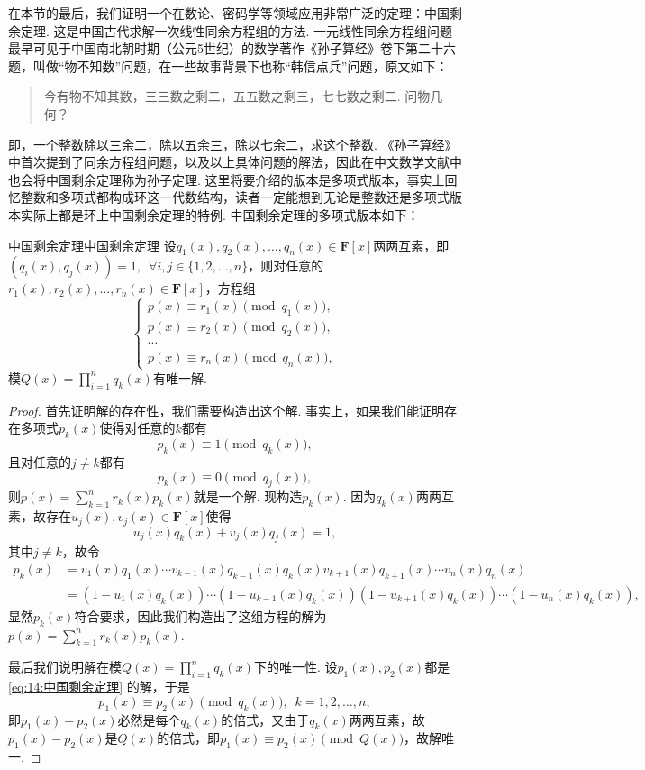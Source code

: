 在本节的最后，我们证明一个在数论、密码学等领域应用非常广泛的定理：中国剩余定理. 这是中国古代求解一次线性同余方程组的方法. 一元线性同余方程组问题最早可见于中国南北朝时期（公元5世纪）的数学著作《孙子算经》卷下第二十六题，叫做``物不知数''问题，在一些故事背景下也称``韩信点兵''问题，原文如下：
\begin{quote}
    \kaishu
    今有物不知其数，三三数之剩二，五五数之剩三，七七数之剩二. 问物几何？
\end{quote}
即，一个整数除以三余二，除以五余三，除以七余二，求这个整数. 《孙子算经》中首次提到了同余方程组问题，以及以上具体问题的解法，因此在中文数学文献中也会将中国剩余定理称为孙子定理. 这里将要介绍的版本是多项式版本，事实上回忆整数和多项式都构成环这一代数结构，读者一定能想到无论是整数还是多项式版本实际上都是环上中国剩余定理的特例. 中国剩余定理的多项式版本如下：
\begin{theorem}{中国剩余定理}{中国剩余定理}
    设$q_1(x),q_2(x),\ldots,q_n(x)\in\mathbf{F}[x]$两两互素，即$(q_i(x),q_j(x))=1,\enspace\forall i,j\in\{1,2,\ldots,n\}$，则对任意的$r_1(x),r_2(x),\ldots,r_n(x)\in\mathbf{F}[x]$，方程组
    \begin{equation} \label{eq:14:中国剩余定理}
        \begin{cases}
            p(x)\equiv r_1(x)\pmod{q_1(x)}, \\
            p(x)\equiv r_2(x)\pmod{q_2(x)}, \\
            \cdots                          \\
            p(x)\equiv r_n(x)\pmod{q_n(x)},
        \end{cases}
    \end{equation}
    模$Q(x)=\prod\limits_{i=1}^nq_k(x)$有唯一解.
\end{theorem}
\begin{proof}
    首先证明解的存在性，我们需要构造出这个解. 事实上，如果我们能证明存在多项式$p_k(x)$使得对任意的$k$都有
    \[p_k(x)\equiv 1\pmod{q_k(x)},\]
    且对任意的$j\neq k$都有
    \[p_k(x)\equiv 0\pmod{q_j(x)},\]
    则$p(x)=\sum\limits_{k=1}^nr_k(x)p_k(x)$就是一个解. 现构造$p_k(x)$. 因为$q_k(x)$两两互素，故存在$u_j(x),v_j(x)\in\mathbf{F}[x]$使得
    \[u_j(x)q_k(x)+v_j(x)q_j(x)=1,\]
    其中$j\neq k$，故令
    \begin{align*}
        p_k(x) & =v_1(x)q_1(x)\cdots v_{k-1}(x)q_{k-1}(x)q_k(x)v_{k+1}(x)q_{k+1}(x)\cdots v_n(x)q_n(x)  \\
               & =(1-u_1(x)q_k(x))\cdots(1-u_{k-1}(x)q_k(x))(1-u_{k+1}(x)q_k(x))\cdots(1-u_n(x)q_k(x)),
    \end{align*}
    显然$p_k(x)$符合要求，因此我们构造出了这组方程的解为$p(x)=\sum\limits_{k=1}^nr_k(x)p_k(x)$.

    最后我们说明解在模$Q(x)=\prod\limits_{i=1}^nq_k(x)$下的唯一性. 设$p_1(x),p_2(x)$都是\autoref{eq:14:中国剩余定理} 的解，于是
    \[p_1(x)\equiv p_2(x)\pmod{q_k(x)},\enspace k=1,2,\ldots,n,\]
    即$p_1(x)-p_2(x)$必然是每个$q_k(x)$的倍式，又由于$q_k(x)$两两互素，故$p_1(x)-p_2(x)$是$Q(x)$的倍式，即$p_1(x)\equiv p_2(x)\pmod{Q(x)}$，故解唯一.
\end{proof}


